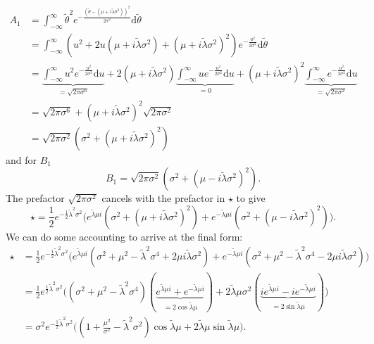 \documentclass[]{report}
\begin{document}
\begin{align}
    A_1 &= \int_{-\infty}^{\infty}\tilde{\theta}^2e^{-\frac{(\tilde{\theta} - (\mu + i \tilde{\lambda} \sigma^2))^2}{2\sigma^2}} \text{d}\tilde{\theta}\\
    &= \int_{-\infty}^{\infty}(u^2 + 2u(\mu + i \tilde{\lambda} \sigma^2) + (\mu + i \tilde{\lambda} \sigma^2)^2)e^{-\frac{u^2}{2\sigma^2}} \text{d}\tilde{\theta}\\
    &=
    \underbrace{\int_{-\infty}^{\infty}u^2 e^{-\frac{u^2}{2\sigma^2}} \text{d}u}_{=\sqrt{2\pi\sigma^6}} +
    2(\mu + i \tilde{\lambda} \sigma^2) \underbrace{\int_{-\infty}^{\infty} ue^{-\frac{u^2}{2\sigma^2}} \text{d}u}_{=0} +
    (\mu + i \tilde{\lambda} \sigma^2)^2 \underbrace{\int_{-\infty}^{\infty}e^{-\frac{u^2}{2\sigma^2}} \text{d}u}_{=\sqrt{2\pi\sigma^2}}\\
    &= \sqrt{2\pi\sigma^6} + (\mu + i \tilde{\lambda} \sigma^2)^2 \sqrt{2\pi\sigma^2}\\
    &= \sqrt{2\pi\sigma^2} (\sigma^2 + (\mu + i \tilde{\lambda} \sigma^2)^2)
\end{align}
and for $B_1$
\begin{equation}
    B_1 = \sqrt{2\pi\sigma^2} (\sigma^2 + (\mu - i \tilde{\lambda} \sigma^2)^2).
\end{equation}
The prefactor $\sqrt{2\pi\sigma^2}$ cancels with the prefactor in $\star$ to give
\begin{equation}
    \star = \frac{1}{2}e^{-\frac{1}{2}\tilde{\lambda}^2\sigma^2}
    \Big(
        e^{\tilde{\lambda} \mu i}(\sigma^2 + (\mu + i \tilde{\lambda} \sigma^2)^2) +
        e^{-\tilde{\lambda} \mu i}(\sigma^2 + (\mu - i \tilde{\lambda} \sigma^2)^2)
    \Big).
\end{equation}
We can do some accounting to arrive at the final form:
\begin{align}
    \star &= \frac{1}{2}e^{-\frac{1}{2}\tilde{\lambda}^2\sigma^2}
    \Big(
        e^{\tilde{\lambda} \mu i}(\sigma^2 + \mu^2 - \tilde{\lambda}^2\sigma^4 + 2\mu i \tilde{\lambda} \sigma^2) +
        e^{-\tilde{\lambda} \mu i}(\sigma^2 + \mu^2 - \tilde{\lambda}^2\sigma^4 - 2\mu i \tilde{\lambda} \sigma^2)
    \Big)\\
    &= \frac{1}{2}e^{\frac{1}{2}\tilde{\lambda}^2\sigma^2}
    \Big(
        (\sigma^2 + \mu^2 - \tilde{\lambda}^2\sigma^4)(\underbrace{e^{\tilde{\lambda} \mu i} + e^{-\tilde{\lambda} \mu i}}_{=2\cos{\tilde{\lambda} \mu}})
        + 2\tilde{\lambda} \mu \sigma^2(\underbrace{i e^{\tilde{\lambda} \mu i} - ie^{-\tilde{\lambda} \mu i}}_{=2\sin{\tilde{\lambda} \mu}})
    \Big)\\
    &= \sigma^2 e^{-\frac{1}{2}\tilde{\lambda}^2\sigma^2}\Big((1 + \frac{\mu^2}{\sigma^2} - \tilde{\lambda}^2\sigma^2)\cos{\tilde{\lambda} \mu} + 2\tilde{\lambda} \mu \sin{\tilde{\lambda} \mu}\Big).
\end{align}
\end{document}
